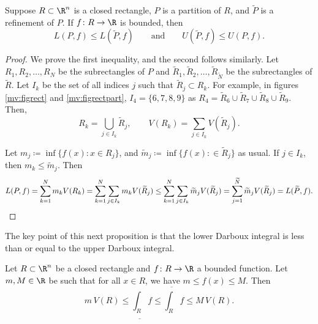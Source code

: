 \begin{prop} \label{mv:prop:refinement}
Suppose $R \subset \R^n$ is a closed rectangle, $P$ is a partition of $R$,
and $\widetilde{P}$ is a refinement of $P$.
If $f \colon R \to \R$ is bounded,
then
\begin{equation*}
L(P,f) \leq L(\widetilde{P},f) 
\qquad \text{and} \qquad
U(\widetilde{P},f) \leq U(P,f) .
\end{equation*}
\end{prop}

\begin{proof}
We prove the first inequality, and the second follows similarly.
Let $R_1,R_2,\ldots,R_N$ be the subrectangles of $P$
and
$\widetilde{R}_1,\widetilde{R}_2,\ldots,\widetilde{R}_{\widetilde{N}}$ be the
subrectangles of
$\widetilde{R}$.
Let $I_k$ be the set of all indices $j$ such that $\widetilde{R}_j \subset R_k$.
For example, in figures \ref{mv:figrect} and
\ref{mv:figrectpart}, $I_4 = \{ 6, 7, 8, 9 \}$ as
$R_4 =
\widetilde{R}_6 \cup \widetilde{R}_7 \cup
\widetilde{R}_8 \cup \widetilde{R}_9$.
Then,
\begin{equation*}
R_k = \bigcup_{j \in I_k} \widetilde{R}_j,
\qquad
V(R_k) = \sum_{j \in I_k} V(\widetilde{R}_j).
\end{equation*}

Let $m_j \coloneqq \inf \bigl\{ f(x) : x \in R_j \bigr\}$, and
$\widetilde{m}_j \coloneqq \inf \bigl\{ f(x) : \in \widetilde{R}_j \bigr\}$ as usual.
If $j \in I_k$, then $m_k \leq \widetilde{m}_j$.  Then
\begin{equation*}
L(P,f)
=
\sum_{k=1}^N m_k V(R_k)
=
\sum_{k=1}^N \sum_{j\in I_k} m_k V(\widetilde{R}_j)
\leq
\sum_{k=1}^N \sum_{j\in I_k} \widetilde{m}_j V(\widetilde{R}_j)
=
\sum_{j=1}^{\widetilde{N}} \widetilde{m}_j V(\widetilde{R}_j) = L(\widetilde{P},f) .
\qedhere
\end{equation*}
\end{proof}

The key point of this next proposition is that
the lower Darboux integral is less than or equal to the upper Darboux
integral.

\begin{prop} \label{mv:intulbound:prop}
Let $R \subset \R^n$ be a closed rectangle and
$f \colon R \to \R$ a bounded function.  Let $m, M \in \R$ be 
such that for all $x \in R$, we have $m \leq f(x) \leq M$.  Then
\begin{equation}
\label{mv:intulbound:eq}
m \, V(R) \leq
\underline{\int_R} f \leq \overline{\int_R} f
\leq M \, V(R).
\end{equation}
\end{prop}


